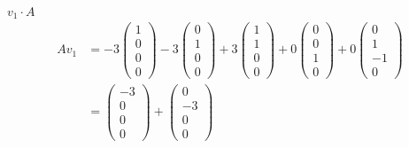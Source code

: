 \documentclass{article}
\begin{document}
\begin{enumerate}
        \ResetCases
        \begin{mathcase}{\(v_1 \cdot A\)}
            \[
                \begin{aligned}
                    Av_1 &= 
                    -3
                    \begin{pmatrix}
                        1 \\ 0 \\ 0 \\ 0
                    \end{pmatrix}
                    -3
                    \begin{pmatrix}
                        0 \\ 1 \\ 0 \\ 0
                    \end{pmatrix}
                    +3
                    \begin{pmatrix}
                        1 \\ 1 \\ 0 \\ 0
                    \end{pmatrix}
                    +0
                    \begin{pmatrix}
                        0 \\ 0 \\ 1 \\ 0
                    \end{pmatrix}
                    +0
                    \begin{pmatrix}
                        0 \\ 1 \\ -1 \\ 0
                    \end{pmatrix} 
                    \\
                    &= 
                    \begin{pmatrix}
                        -3 \\ 0 \\ 0 \\ 0
                    \end{pmatrix}
                    +
                    \begin{pmatrix}
                        0 \\ -3 \\ 0 \\ 0
                    \end{pmatrix}

\end{aligned}\]
\end{mathcase}
\end{enumerate}
\end{document}
